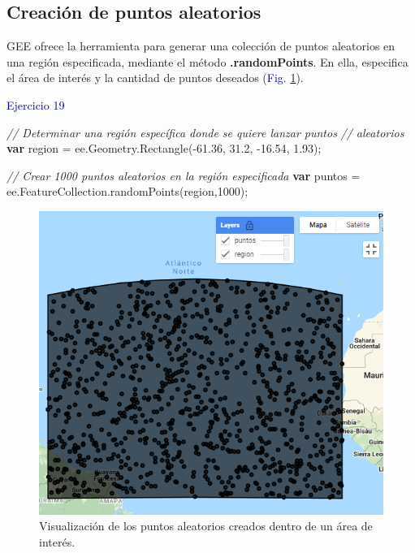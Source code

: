 \documentclass[
  12pt,
  letterpaper,
  twoside]{book}
\newenvironment{Shaded}{\begin{snugshade}}{\end{snugshade}}
\newcommand{\AttributeTok}[1]{\textcolor[rgb]{0.48,0.12,0.64}{#1}}
\newcommand{\CommentTok}[1]{\textcolor[rgb]{0.24,0.58,0.00}{\textit{#1}}}
\newcommand{\DecValTok}[1]{\textcolor[rgb]{0.28,0.53,0.93}{#1}}
\newcommand{\FloatTok}[1]{\textcolor[rgb]{0.28,0.53,0.93}{#1}}
\newcommand{\FunctionTok}[1]{\textcolor[rgb]{0.48,0.12,0.64}{#1}}
\newcommand{\KeywordTok}[1]{\textcolor[rgb]{0.00,0.00,0.00}{\textbf{#1}}}
\newcommand{\NormalTok}[1]{#1}
\newcommand{\OperatorTok}[1]{\textcolor[rgb]{0.00,0.00,0.00}{#1}}
\newcommand\boldpurple[1]{\textcolor{darkpurple}{\textbf{#1}}}
\begin{document}
\hypertarget{creaciuxf3n-de-puntos-aleatorios}{%
\subsection*{Creación de puntos aleatorios}\label{creaciuxf3n-de-puntos-aleatorios}}

GEE ofrece la herramienta para generar una colección de puntos aleatorios en una región especificada, mediante el método \boldpurple{.randomPoints}. En ella, especifica el área de interés y la cantidad de puntos deseados (\textcolor{darkblue}{Fig.} \ref{fig:f87}).

\textcolor{darkblue}{Ejercicio 19}

\begin{Shaded}
\begin{Highlighting}[]
\CommentTok{// Determinar una región específica donde se quiere lanzar puntos }
\CommentTok{// aleatorios}
\KeywordTok{var}\NormalTok{ region }\OperatorTok{=}\NormalTok{ ee}\OperatorTok{.}\AttributeTok{Geometry}\OperatorTok{.}\FunctionTok{Rectangle}\NormalTok{(}\OperatorTok{{-}}\FloatTok{61.36}\OperatorTok{,} \FloatTok{31.2}\OperatorTok{,} \OperatorTok{{-}}\FloatTok{16.54}\OperatorTok{,} \FloatTok{1.93}\NormalTok{)}\OperatorTok{;}

\CommentTok{// Crear 1000 puntos aleatorios en la región especificada}
\KeywordTok{var}\NormalTok{ puntos }\OperatorTok{=}\NormalTok{ ee}\OperatorTok{.}\AttributeTok{FeatureCollection}\OperatorTok{.}\FunctionTok{randomPoints}\NormalTok{(region}\OperatorTok{,}\DecValTok{1000}\NormalTok{)}\OperatorTok{;}
\end{Highlighting}
\end{Shaded}

\begin{figure}[H]

{\centering \includegraphics[width=0.95\linewidth]{Img/ej19} 

}

\caption{Visualización de los puntos aleatorios creados dentro de un área de interés.}\label{fig:f87}
\end{figure}
\end{document}
